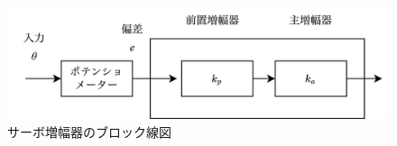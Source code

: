 \begin{figure}
	\centering
	\includegraphics[width=0.8\linewidth]{src/figures/amplifier/amplifier.png}
	\caption{サーボ増幅器のブロック線図}\label{fig:amplifier}
\end{figure}
